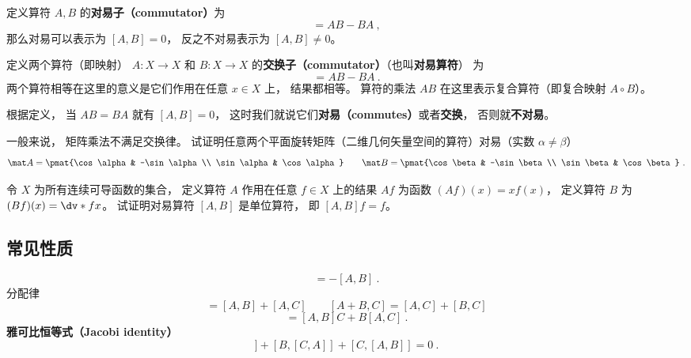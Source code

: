 
定义算符 $A,B$ 的\textbf{对易子（commutator）}为
\begin{equation}
[A, B] = AB - BA~,
\end{equation}
那么对易可以表示为 $[A,B] = 0$， 反之不对易表示为 $[A,B]\ne 0$。



定义两个算符（即映射） $A: X\to X$ 和 $B: X\to X$ 的\textbf{交换子（commutator）}（也叫\textbf{对易算符}） 为
\begin{equation}
[A, B] = A B - B A~.
\end{equation}
两个算符相等在这里的意义是它们作用在任意 $x \in X$ 上， 结果都相等。 算符的乘法 $AB$ 在这里表示复合算符（即复合映射 $A\circ B$）。

根据定义， 当 $A B = B A$ 就有 $[A, B] = 0$， 这时我们就说它们\textbf{对易（commutes）}或者\textbf{交换}， 否则就\textbf{不对易}。

\begin{exercise}{}
一般来说， 矩阵乘法不满足交换律。 试证明任意两个平面旋转矩阵（二维几何矢量空间的算符）对易（实数 $\alpha \ne \beta$）
\begin{equation}
\mat A  = \pmat{\cos\alpha & -\sin\alpha\\ \sin\alpha & \cos\alpha}
\qquad
\mat B  = \pmat{\cos\beta & -\sin\beta\\ \sin\beta & \cos\beta}~.
\end{equation}
\end{exercise}

\begin{exercise}{}
令 $X$ 为所有连续可导函数的集合， 定义算符 $A$ 作用在任意 $f\in X$ 上的结果 $Af$ 为函数 $(Af)(x) = x f(x)$， 定义算符 $B$ 为 $(Bf)(x) = \dv*{f}{x}$。 试证明对易算符 $[A, B]$ 是单位算符， 即 $[A, B]f = f$。
\end{exercise}

\subsection{常见性质}
\begin{equation}
[B, A] = -[A, B]~.
\end{equation}
分配律
\begin{equation}
[A, B + C] = [A, B] + [A, C]
\qquad
[A + B, C] = [A, C] + [B, C]
\end{equation}
\begin{equation}
[A, BC] = [A, B]C + B[A, C]~.
\end{equation}
\textbf{雅可比恒等式（Jacobi identity）}
\begin{equation}
[A, [B, C]] + [B, [C, A]] + [C, [A, B]] = 0~.
\end{equation}

